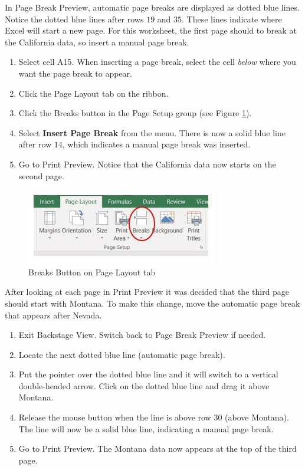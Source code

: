 In Page Break Preview, automatic page breaks are displayed as dotted blue lines. Notice the dotted blue lines after rows $ 19 $ and $ 35 $. These lines indicate where Excel will start a new page. For this worksheet, the first page should to break at the California data, so insert a manual page break.

\begin{enumerate}
	\item Select cell \textsf{A15}. When inserting a page break, select the cell \textit{below} where you want the page break to appear.
	\item Click the Page Layout tab on the ribbon.
	\item Click the Breaks button in the Page Setup group (see Figure \ref{03:fig31}).
	\item Select \textbf{Insert Page Break} from the menu. There is now a solid blue line after row $ 14 $, which indicates a manual page break was inserted.
	\item Go to Print Preview. Notice that the California data now starts on the second page.
\end{enumerate}

\begin{figure}[H]
	\centering
	\includegraphics[width=\maxwidth{.95\linewidth}]{gfx/ch03_fig31}
	\caption{Breaks Button on Page Layout tab}
	\label{03:fig31}
\end{figure}

After looking at each page in Print Preview it was decided that the third page should start with Montana. To make this change, move the automatic page break that appears after Nevada.

\begin{enumerate}
	\item Exit Backstage View. Switch back to Page Break Preview if needed.
	\item Locate the next dotted blue line (automatic page break).
	\item Put the pointer over the dotted blue line and it will switch to a vertical double-headed arrow. Click on the dotted blue line and drag it above Montana.
	\item Release the mouse button when the line is above row $ 30 $ (above Montana). The line will now be a solid blue line, indicating a manual page break.
	\item Go to Print Preview. The Montana data now appears at the top of the third page.
\end{enumerate}

